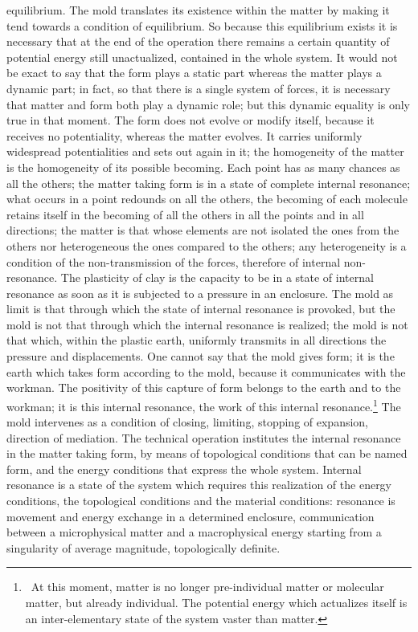 \documentclass[a4paper]{article}
\begin{document}
equilibrium. The mold translates its existence within the matter by making it tend towards a condition of equilibrium. So because this equilibrium exists it is necessary that at the end of the operation there remains a certain quantity of potential energy still unactualized, contained in the whole system. It would not be exact to say that the form plays a static part whereas the matter plays a dynamic part; in fact, so that there is a single system of forces, it is necessary that matter and form both play a dynamic role; but this dynamic equality is only true in that moment. The form does not evolve or modify itself, because it receives no potentiality, whereas the matter evolves. It carries uniformly widespread potentialities and sets out again in it; the homogeneity of the matter is the homogeneity of its possible becoming. Each point has as many chances as all the others; the matter taking form is in a state of complete internal resonance; what occurs in a point redounds on all the others, the becoming of each molecule retains itself in the becoming of all the others in all the points and in all directions; the matter is that whose elements are not isolated the ones from the others nor heterogeneous the ones compared to the others; any heterogeneity is a condition of the non-transmission of the forces, therefore of internal non-resonance. The plasticity of clay is the capacity to be in a state of internal resonance as soon as it is subjected to a pressure in an enclosure. The mold as limit is that through which the state of internal resonance is provoked, but the mold is not that through which the internal resonance is realized; the mold is not that which, within the plastic earth, uniformly transmits in all directions the pressure and displacements. One cannot say that the mold gives form; it is the earth which takes form according to the mold, because it communicates with the workman. The positivity of this capture of form belongs to the earth and to the workman; it is this internal resonance, the work of this internal resonance.\footnote{\ At this moment, matter is no longer pre-individual matter or molecular matter, but already individual. The potential energy which actualizes itself is an inter-elementary state of the system vaster than matter.} The mold intervenes as a condition of closing, limiting, stopping of expansion, direction of mediation. The technical operation institutes the internal resonance in the matter taking form, by means of topological conditions that can be named form, and the energy conditions that express the whole system. Internal resonance is a state of the system which requires this realization of the energy conditions, the topological conditions and the material conditions: resonance is movement and energy exchange in a determined enclosure, communication between a microphysical matter and a macrophysical energy starting from a singularity of average magnitude, topologically definite.
\end{document}
